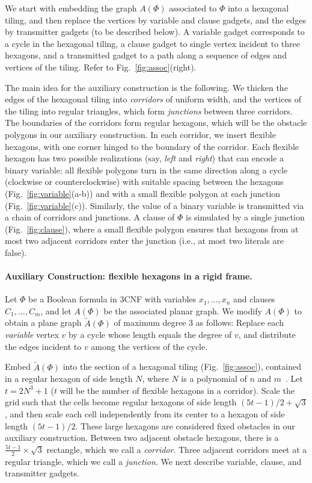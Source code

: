 \documentclass[runningheads]{article}
\begin{document}
We start with embedding the graph $A(\Phi)$ associated to $\Phi$ into a hexagonal tiling, and then replace the vertices by variable and clause gadgets, and the edges by transmitter gadgets (to be described below). A variable gadget corresponds to a cycle in the hexagonal tiling, a clause gadget to single vertex incident to three hexagons, and a transmitted gadget to a path along a sequence of edges and vertices of the tiling. Refer to Fig.~\ref{fig:assoc}(right).

The main idea for the auxiliary construction is the following. We thicken the edges of the hexagonal tiling into \emph{corridors} of uniform width, and the vertices of the tiling into regular triangles, which form \emph{junctions} between three corridors. The boundaries of the corridors form regular hexagons, which will be the obstacle polygons in our auxiliary construction. In each corridor, we insert flexible hexagons, with one corner hinged to the boundary of the corridor. Each flexible hexagon has two possible realizations (say, \emph{left} and \emph{right}) that can encode a binary variable: all flexible polygons turn in the same direction along a cycle (clockwise or counterclockwise) with suitable spacing between the hexagons (Fig.~\ref{fig:variable}(a-b)) and with a small flexible polygon at each junction (Fig.~\ref{fig:variable}(c)). Similarly, the value of a binary variable is transmitted via a chain of corridors and junctions. A clause of $\Phi$ is simulated by a single junction (Fig.~\ref{fig:clause}), where a small flexible polygon ensures that hexagons from at most two adjacent corridors enter the junction (i.e., at most two literals are false).

\paragraph{Auxiliary Construction: flexible hexagons in a rigid frame.}
Let $\Phi$ be a Boolean formula in 3CNF with variables $x_1,\ldots , x_n$ and clauses $C_1,\ldots ,C_m$, and let $A(\Phi)$ be the associated planar graph. We modify $A(\Phi)$ to obtain a plane graph $\tilde{A}(\Phi)$ of maximum degree 3 as follows: Replace each \emph{variable} vertex $v$ by a cycle whose length equals the degree of $v$, and distribute the edges incident to $v$ among the vertices of the cycle.

Embed $\tilde{A}(\Phi)$ into the section of a hexagonal tiling (Fig.~\ref{fig:assoc}), contained in a regular hexagon of side length $N$, where $N$ is a polynomial of $n$ and $m$~\cite{BK+98}. Let $t=2N^3+1$ ($t$ will be the number of flexible hexagons in a corridor). Scale the grid such that the cells become regular hexagons of side length $(5t-1)/2+\sqrt{3}$, and then scale each cell independently from its center to a hexagon of side length $(5t-1)/2$. These large hexagons are considered fixed obstacles in our auxiliary construction. Between two adjacent obstacle hexagons, there is a $\frac{5t-1}{2}\times \sqrt{3}$ rectangle, which we call a \emph{corridor}. Three adjacent corridors meet at a regular triangle, which we call a \emph{junction}. We next describe variable, clause, and transmitter gadgets.
\end{document}
